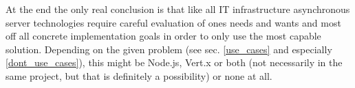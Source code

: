 At the end the only real conclusion is that like all IT infrastructure asynchronous server technologies require careful evaluation of ones needs and wants and most off all concrete implementation goals in order to only use the most capable solution. Depending on the given problem (see sec. \ref{use_cases} and especially \ref{dont_use_cases}), this might be Node.js, Vert.x or both (not necessarily in the same project, but that is definitely a possibility) or none at all. 



